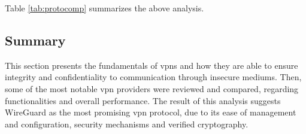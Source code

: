 \documentclass[11pt,twoside,a4paper]{report}
\begin{document}
Table \ref{tab:protocomp} summarizes the above analysis.


\begin{table}[]
\centering
{}
\caption{VPN protocol's performance and features comparison}
\label{tab:protocomp}
\end{table}


\subsection{Summary}

This section presents the fundamentals of \acp{vpn} and how they are able to ensure integrity and confidentiality to communication through insecure mediums. Then, some of the most notable \ac{vpn} providers were reviewed and compared, regarding functionalities and overall performance. The result of this analysis suggests WireGuard as the most promising \ac{vpn} protocol, due to its ease of management and configuration, security mechanisms and verified cryptography.
\end{document}
